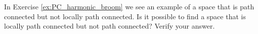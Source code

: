 \begin{comment}

\ExerciseSolution

\ba

\item We will show that the harmonic broom is path connected in part (b), and every path connected space is connected.

\item Let $p$ be a point in $X$, then the line segment containing the origin $o$ an $p$ provides a path from $o$ to $p$. So if $p$ and $q$ are in $X$, there is a path from $p$ to $o$, and a path from $o$ to $q$. The path product then gives a path from $p$ to $q$. So $X$ is path connected. 

\item Let $o = (0,0)$ and let $B = B(o,0.5) \cap X$. Then $B$ is an open set in $X$ that contains $o$, but $B$ does not contain $(0,1)$. Note that any open subset of $B$ will contain infinitely many portions of segments from the point $(1,0)$ to points of the form $(a,0)$ for small enough values of $a$. These segments are not connected, and so $X$ is not locally connected. 

\item Again let $o = (0,0)$ and consider $V = B(o,0.5)$ as an open subset of $X$. Any open subset $U$ of $V$ that contains $o$ must contain an open ball of the form $B(o,r)$ for some $r > 0$. Let $n \in \Z^+$ such that $\frac{1}{n} < r$. Then $p = \left(\frac{1}{n}, 0\right)$ is in $B(o,r)$, but since $(0,1)$ is not in $V$ there is no path in $V$ from $p$ to $o$. So $X$ is not locally path connected. 

\ea

\end{comment}

\item In Exercise \ref{ex:PC_harmonic_broom} we see an example of a space that is path connected but not locally path connected. Is it possible to find a space that is locally path connected but not path connected? Verify your answer.

\begin{comment}

\ExerciseSolution The answer is yes. Let $X = (0,1) \cup (1,2)$ in $(\R^2, d_E)$. Since there is no path in $X$ from $0.5$ to $1.5)$, we see that $X$ is not path connected. However, if $x \in X$, then $x \in (0,1)$ or $x \in (1,2)$. But both $(0,1)$ and $(1,2)$ are path connected, so $X$ is locally path connected.

\end{comment}


